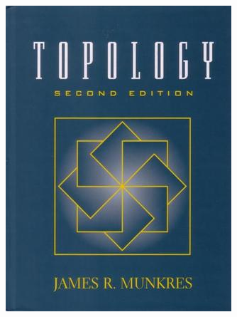 \begin{boxResource}[lefthand width=5cm, sidebyside]{}
\includegraphics[width=\textwidth]{./img/Munkres_Topology}
\tcblower

\end{boxResource}
%
